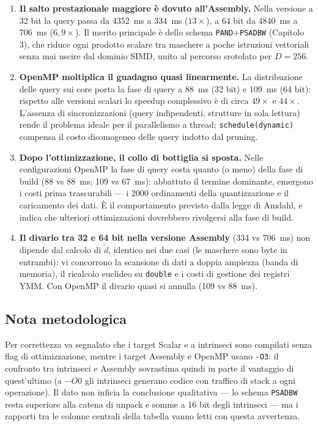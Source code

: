 \begin{enumerate}
    \item \textbf{Il salto prestazionale maggiore è dovuto all'Assembly.} Nella versione a 32 bit la query passa da 4352~ms a 334~ms ($13\times$), a 64 bit da 4840~ms a 706~ms ($6{,}9\times$). Il merito principale è dello schema \texttt{PAND}+\texttt{PSADBW} (Capitolo 3), che riduce ogni prodotto scalare tra maschere a poche istruzioni vettoriali senza mai uscire dal dominio SIMD, unito al percorso srotolato per $D=256$.
    \item \textbf{OpenMP moltiplica il guadagno quasi linearmente.} La distribuzione delle query sui core porta la fase di query a 88~ms (32 bit) e 109~ms (64 bit): rispetto alle versioni scalari lo speedup complessivo è di circa $49\times$ e $44\times$. L'assenza di sincronizzazioni (query indipendenti, strutture in sola lettura) rende il problema ideale per il parallelismo a thread; \texttt{schedule(dynamic)} compensa il costo disomogeneo delle query indotto dal pruning.
    \item \textbf{Dopo l'ottimizzazione, il collo di bottiglia si sposta.} Nelle configurazioni OpenMP la fase di query costa quanto (o meno) della fase di build (88 vs 88~ms; 109 vs 67~ms): abbattuto il termine dominante, emergono i costi prima trascurabili — i 2000 ordinamenti della quantizzazione e il caricamento dei dati. È il comportamento previsto dalla legge di Amdahl, e indica che ulteriori ottimizzazioni dovrebbero rivolgersi alla fase di build.
    \item \textbf{Il divario tra 32 e 64 bit nella versione Assembly} (334 vs 706~ms) non dipende dal calcolo di $\tilde{d}$, identico nei due casi (le maschere sono byte in entrambi): vi concorrono la scansione di dati a doppia ampiezza (banda di memoria), il ricalcolo euclideo su \texttt{double} e i costi di gestione dei registri YMM. Con OpenMP il divario quasi si annulla (109 vs 88~ms).
\end{enumerate}

\subsection{Nota metodologica}
Per correttezza va segnalato che i target Scalar e a intrinseci sono compilati senza flag di ottimizzazione, mentre i target Assembly e OpenMP usano \texttt{-O3}: il confronto tra intrinseci e Assembly sovrastima quindi in parte il vantaggio di quest'ultimo (a $-O0$ gli intrinseci generano codice con traffico di stack a ogni operazione). Il dato non inficia la conclusione qualitativa — lo schema \texttt{PSADBW} resta superiore alla catena di unpack e somme a 16 bit degli intrinseci — ma i rapporti tra le colonne centrali della tabella vanno letti con questa avvertenza.

